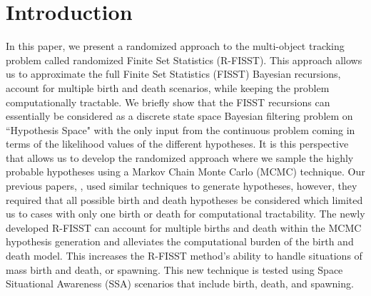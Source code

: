 \documentclass[10pt, conference]{IEEEtran}
\begin{document}
\section{Introduction}
In this paper, we present a randomized approach to the multi-object tracking problem called randomized Finite Set Statistics (R-FISST). This approach allows us to approximate the full Finite Set Statistics (FISST) Bayesian recursions, account for multiple birth and death scenarios, while keeping the problem computationally tractable. We briefly show that the FISST recursions can essentially be considered as a discrete state space Bayesian filtering problem on ``Hypothesis Space" with the only input from the continuous problem coming in terms of the likelihood values of the different hypotheses. It is this perspective that allows us to develop the randomized approach where we sample the highly probable hypotheses using a Markov Chain Monte Carlo (MCMC) technique. Our previous papers, \cite{Faber1,Faber2}, used similar techniques to generate hypotheses, however, they required that all possible birth and death hypotheses be considered which limited us to cases with only one birth or death for computational tractability. The newly developed R-FISST can account for multiple births and death within the MCMC hypothesis generation and alleviates the computational burden of the  birth and death model. This increases the R-FISST method's ability to handle situations of mass birth and death, or spawning.  This new technique is tested using Space Situational Awareness (SSA) scenarios that include birth, death, and spawning. 
\end{document}
